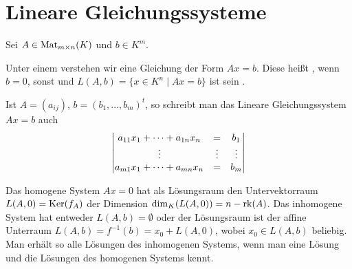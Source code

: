 \section{Lineare Gleichungssysteme}

Sei $A\in \operatorname{Mat}_{m\times n}(K)$ und $b\in K^m$.

\begin{definition}
	Unter einem  verstehen wir eine Gleichung der Form $Ax=b$. 
	Diese heißt , wenn $b=0$, sonst  und $L(A,b)=\{x\in K^n\mid Ax=b\}$ ist sein .
\end{definition}

\begin{remark}
	Ist $A=(a_{ij})$, $b=(b_1,...,b_m)^t$, so schreibt man das Lineare Gleichungssystem $Ax=b$ auch
	\begin{align}
	\begin{vmatrix}
		a_{11}x_1 + \dots + a_{1n}x_n & = & b_1\\
		\vdots & \vdots & \vdots\\
		a_{m1}x_1 + \dots + a_{mn}x_n & = & b_m\\
	\end{vmatrix}\notag
	\end{align}
\end{remark}

\begin{remark}
	Das homogene System $Ax=0$ hat als Lösungsraum den Untervektorraum $L(A,0)=\operatorname{Ker}(f_A)$ der Dimension $\dim_K(L(A,0))=n-\operatorname{rk}(A)$. Das 
	inhomogene System hat entweder $L(A,b)=\emptyset$ oder der Lösungsraum ist der affine Unterraum $L(A,b)=f^{-1}(b)=x_0+L(A,0)$, wobei 
	$x_0\in L(A,b)$ beliebig. Man erhält so alle Lösungen des inhomogenen Systems, wenn man eine Lösung und die Lösungen des homogenen 
	Systems kennt.
\end{remark}

